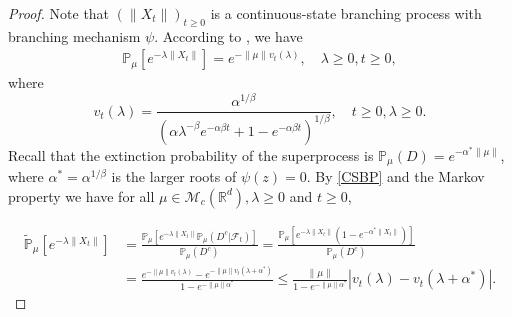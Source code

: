 \documentclass[12pt]{amsart}
\theoremstyle{plain}
\theoremstyle{definition}
\numberwithin{equation}{section}
\begin{document}
\begin{proof}
    Note that $(\|X_t\|)_{t\geq 0}$ is a continuous-state branching process with branching mechanism $\psi$. According to \cite[Example 3.1]{Li2011Measure-valued}, we have
\begin{align}\label{CSBP}
    \mathbb{P}_{\mu} [e^{-\lambda\|X_t\|}]
    =e^{-\|\mu\|v_t(\lambda)},
    \quad \lambda \geq 0, t\geq 0,
\end{align}
    where
\[
    v_t(\lambda)=\frac{\alpha^{1/\beta}}{(\alpha\lambda^{-\beta}e^{-\alpha \beta t}+1-e^{-\alpha \beta t})^{1/\beta}},\quad t\geq 0,\lambda\geq 0.
\]
    Recall that the extinction probability of the superprocess is $\mathbb{P}_{\mu}(D)=e^{-\alpha^*\|\mu\|}$, where $\alpha^*=\alpha^{1/\beta}$ is the larger roots of $\psi(z)=0$.
    By \eqref{CSBP} and the Markov property we have for all $\mu \in \mathcal M_c(\mathbb R^d), \lambda \geq 0$ and
    $t\geq 0$,

\begin{align}
    \label{laplaceexpress}
    \mathbb{\tilde{P}}_{\mu}[e^{-\lambda \|X_t\|}]
    &=\frac{ \mathbb P_\mu[e^{-\lambda \|X_t\| }\mathbb P_\mu(D^c| \mathscr F_t)] }{\mathbb P_\mu(D^c)}
    =\frac{ \mathbb P_\mu[e^{-\lambda \|X_t\| }(1-e^{-\alpha^*\|X_t\|})] }{\mathbb P_\mu(D^c)}
    \\&=\frac{e^{-\|\mu\|v_t(\lambda)}-e^{-\|\mu\|v_t(\lambda+\alpha^*)}}{1-e^{-\|\mu\|\alpha^*}}
    \leq \frac{\|\mu\|}{1-e^{-\|\mu\|\alpha^*}}\left|v_t(\lambda)-v_t(\lambda+\alpha^*)\right|.
\end{align}


\end{proof}
\end{document}
